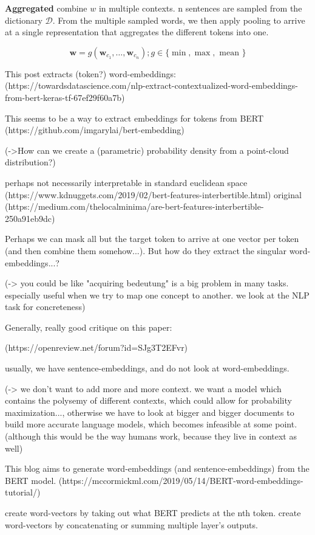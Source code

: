 \documentclass[a4paper,12pt,twoside,openright]{report}
\begin{document}
\textbf{Aggregated} combine $w$ in multiple contexts.
n sentences are sampled from the dictionary $\mathcal{D}$.
From the multiple sampled words, we then apply pooling to arrive at a single representation that aggregates the different tokens into one.

$$
\mathbf{w}=g\left(\mathbf{w}_{c_{1}}, \dots, \mathbf{w}_{c_{n}}\right) ; g \in\{\min , \max , \text { mean }\}
$$


This post extracts (token?) word-embeddings: 
(https://towardsdatascience.com/nlp-extract-contextualized-word-embeddings-from-bert-keras-tf-67ef29f60a7b)

This seems to be a way to extract embeddings for tokens from BERT
(https://github.com/imgarylai/bert-embedding)

(->How can we create a (parametric) probability density from a point-cloud distribution?)

perhaps not necessarily interpretable in standard euclidean space
(https://www.kdnuggets.com/2019/02/bert-features-interbertible.html)
original (https://medium.com/thelocalminima/are-bert-features-interbertible-250a91eb9dc)

Perhaps we can mask all but the target token to arrive at one vector per token (and then combine them somehow...).
But how do they extract the singular word-embeddings...?

(-> you could be like "acquiring bedeutung" is a big problem in many tasks. especially useful when we try to map one concept to another. we look at the NLP task for concreteness)

Generally, really good critique on this paper:

(https://openreview.net/forum?id=SJg3T2EFvr)

usually, we have sentence-embeddings, and do not look at word-embeddings.

(-> we don't want to add more and more context. we want a model which contains the polysemy of different contexts, which could allow for probability maximization..., otherwise we have to look at bigger and bigger documents to build more accurate language models, which becomes infeasible at some point. (although this would be the way humans work, because they live in context as well)

This blog aims to generate word-embeddings (and sentence-embeddings) from the BERT model.
(https://mccormickml.com/2019/05/14/BERT-word-embeddings-tutorial/)

create word-vectors by taking out what BERT predicts at the nth token.
create word-vectors by concatenating or summing multiple layer's outputs.
\end{document}

